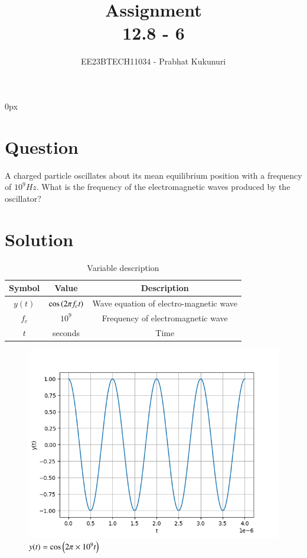 \documentclass[journal,12pt,twocolumn]{IEEEtran}
\theoremstyle{remark}
\begin{document}
\parindent 0px


\title{Assignment\\[1ex]12.8 - 6}
\author{EE23BTECH11034 - Prabhat Kukunuri$^{}$%
}
\maketitle
\newpage
\bigskip

\renewcommand{\thefigure}{\theenumi}
\renewcommand{\thetable}{\theenumi}
\section*{Question}
A charged particle oscillates about its mean equilibrium position with a frequency of $10^9Hz$. What is the frequency of the electromagnetic waves produced by the oscillator?

\section*{Solution}

\begin{table}[h]
    \centering
    \begin{tabular}{|c|c|c|}
    \hline
   Symbol&Value&Description\\ \hline
   $y(t)$&$\cos\left(2{\pi}f_ct\right)$&Wave equation of electro-magnetic wave\\ \hline
   $f_c$&$10^9$&Frequency of electromagnetic wave\\ \hline
   $t$&seconds&Time\\ \hline

    \end{tabular}
    \caption{Variable description}
    \label{tab:12.8.6.1}
\end{table}

\begin{figure}[h]
    \centering
    \includegraphics[width=\columnwidth]{Figure_1.png}
    \caption{$y(t)=\cos\left(2{\pi}\times 10^9t\right)$}
    \label{fig:12.8.6.2}
\end{figure}
\end{document}
